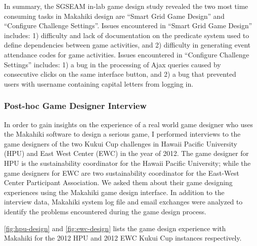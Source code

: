 In summary, the SGSEAM in-lab game design study revealed the two most time consuming tasks in  Makahiki design are ``Smart Grid Game Design'' and ``Configure Challenge Settings''. Issues encountered in ``Smart Grid Game Design'' includes: 1) difficulty and lack of documentation on the predicate system used to define dependencies between game activities, and 2) difficulty in generating event attendance codes for game activities. Issues encountered in ``Configure Challenge Settings'' includes: 1) a bug in the processing of Ajax queries caused by consecutive clicks on the same interface button, and 2) a bug that prevented users with username containing capital letters from logging in.

\subsubsection{Post-hoc Game Designer Interview}

In order to gain insights on the experience of a real world game designer who uses the Makahiki software to design a serious game, I performed interviews to the game designers of the two Kukui Cup challenges in Hawaii Pacific University (HPU) and East West Center (EWC) in the year of 2012. The game designer for HPU is the sustainability coordinator for the Hawaii Pacific University; while the game designers for EWC are two sustainability coordinator for the East-West Center Participant Association. We asked them about their game designing experiences using the Makahiki game design interface. In addition to the interview data, Makahiki system log file and email exchanges were analyzed to identify the problems encountered during the game design process.

\autoref{fig:hpu-design} and \autoref{fig:ewc-design} lists the game design experience with Makahiki for the 2012 HPU and 2012 EWC Kukui Cup instances respectively. 

